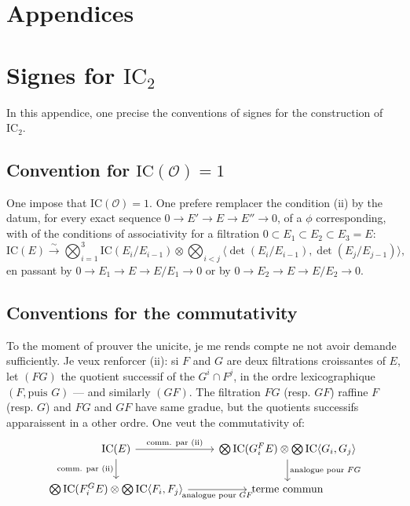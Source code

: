 \documentclass[11pt,a4paper]{article}
\theoremstyle{plain}
\theoremstyle{definition}
\newcommand{\IC}{\mathrm{IC}}
\newcommand{\cO}{\mathcal{O}}
\begin{document}
\newpage

\appendix

\section*{Appendices}

\section{Signes for $\IC_2$}

In this appendice, one precise the conventions of signes for the construction of $\IC_2$.

\subsection{Convention for $\IC(\cO) = 1$}
One impose that $\IC(\cO) = 1$. One prefere remplacer the condition (ii) by the datum, for every exact sequence $0 \to E' \to E \to E'' \to 0$, of a $\phi$ corresponding, with of the conditions of associativity for a filtration $0 \subset E_1 \subset E_2 \subset E_3 = E$:
\begin{equation}
\IC(E) \xrightarrow{\sim} \bigotimes_{i=1}^{3} \IC(E_i/E_{i-1}) \otimes \bigotimes_{i<j} \langle \det(E_i/E_{i-1}), \det(E_j/E_{j-1}) \rangle,
\end{equation}
en passant by $0 \to E_1 \to E \to E/E_1 \to 0$ or by $0 \to E_2 \to E \to E/E_2 \to 0$.

\subsection{Conventions for the commutativity}
To the moment of prouver the unicite, je me rends compte ne not avoir demande sufficiently. Je veux renforcer (ii): si $F$ and $G$ are deux filtrations croissantes of $E$, let $(FG)$ the quotient successif of the $G^i \cap F^j$, in the ordre lexicographique $(F, \text{puis } G)$ --- and similarly $(GF)$. The filtration $FG$ (resp. $GF$) raffine $F$ (resp. $G$) and $FG$ and $GF$ have same gradue, but the quotients successifs apparaissent in a other ordre. One veut the commutativity of:
\begin{equation}
\begin{tikzcd}
\IC(E) \arrow[r, "\text{comm. par (ii)}"] \arrow[d, "\text{comm. par (ii)}"'] & \bigotimes \IC(G_i^F E) \otimes \bigotimes \IC\langle G_i, G_j \rangle \arrow[d, "\text{analogue pour } FG"] \\
\bigotimes \IC(F_i^G E) \otimes \bigotimes \IC\langle F_i, F_j \rangle \arrow[r, "\text{analogue pour } GF"'] & \text{terme commun}
\end{tikzcd}
\end{equation}
\end{document}
